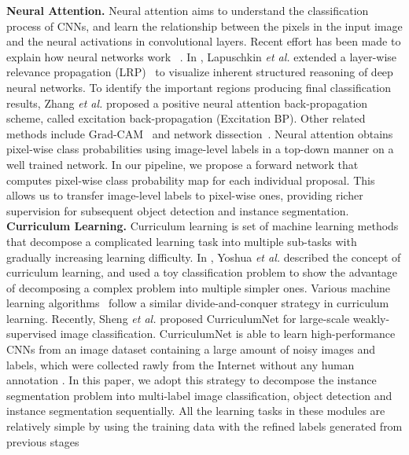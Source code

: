 \documentclass[10pt,twocolumn,letterpaper]{article}
\begin{document}
\noindent\textbf{Neural Attention.} Neural attention aims to understand the classification process of CNNs, and learn the relationship between the pixels in the input image and the neural activations in convolutional layers. Recent effort has been made to explain how neural networks work ~\cite{zhang2016top,bau2017network,lapuschkin2016analyzing}. In \cite{lapuschkin2016analyzing}, Lapuschkin \emph{et al.} extended a layer-wise relevance propagation (LRP)~\cite{bach2015pixel} to visualize inherent structured reasoning of deep neural networks. To identify the important regions producing final classification results, Zhang \emph{et al.} \cite{zhang2016top} proposed a positive neural attention back-propagation scheme, called excitation back-propagation (Excitation BP). Other related methods include Grad-CAM~\cite{selvaraju2017grad} and network dissection~\cite{bau2017network}.
Neural attention obtains pixel-wise class probabilities using image-level labels in a top-down manner on a well trained network. In our pipeline, we propose a forward network that computes pixel-wise class probability map for each individual proposal. This allows us to transfer image-level labels to pixel-wise ones, providing richer supervision for subsequent object detection and instance segmentation. \\

\noindent\textbf{Curriculum Learning.} Curriculum learning \cite{bengio2009curriculum} is set of machine learning methods that decompose a complicated learning task into multiple sub-tasks with gradually increasing learning difficulty. In \cite{bengio2009curriculum}, Yoshua \emph{et al.} described the concept of curriculum learning, and used a toy classification problem to show the advantage of decomposing a complex problem into multiple simpler ones. Various machine learning algorithms~\cite{sun2015robust,graves2017automated} follow a similar divide-and-conquer strategy in curriculum learning. Recently, Sheng \emph{et al.} \cite{Sheng2018} proposed CurriculumNet for large-scale weakly-supervised image classification.  CurriculumNet is able to learn high-performance CNNs from an image dataset containing a large amount of noisy images and labels, which were collected rawly from the Internet without any human annotation \cite{li2017webvision}.
\vspace{-0mm}
In this paper, we adopt this strategy to decompose the instance segmentation problem into multi-label image classification, object detection and instance segmentation sequentially. All the learning tasks in these modules are relatively simple by using the training data with the refined labels generated from previous stages
\end{document}
